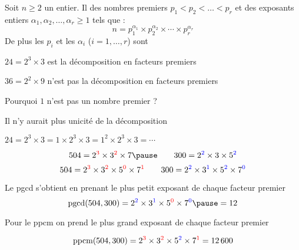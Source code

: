 \begin{frame}
  

\begin{theoreme}
Soit $n \ge 2$ un entier. Il  des nombres premiers $p_1 < p_2 < \ldots < p_r$
et des exposants entiers $\alpha_1, \alpha_2, \ldots, \alpha_r \ge 1$ tels que :
$$n = p_1^{\alpha_1} \times p_2^{\alpha_2} \times \cdots \times p_r^{\alpha_r}$$
\pause
De plus les $p_i$ et les $\alpha_i$ ($i=1,\ldots,r$) sont 
\end{theoreme}

\pause
\pause
\medskip

$24 = 2^3 \times 3$ est la décomposition en facteurs premiers

\pause
$36 = 2^2 \times 9$ n'est pas la décomposition en facteurs premiers

\pause
\bigskip

Pourquoi $1$ n'est pas un nombre premier ?

\pause
Il n'y aurait plus unicité de la décomposition 
\pause
\centerline{$24 = 2^3 \times 3 = 1 \times 2^3 \times 3 = 1^2 \times 2^3 \times 3 = \cdots$}
\end{frame}



\begin{frame}
\begin{exemple}
$$504 = 2^{\color{red}{3}} \times 3^{\color{red}{2}} \times 7 
\pause
\qquad 300 = 2^{\color{blue}{2}} \times 3 \times 5^{\color{blue}{2}}$$
\pause
$$504 = 2^{\color{red}{3}} \times 3^{\color{red}{2}} \times 5^{\color{red}{0}} \times 7^{\color{red}{1}} \qquad 
300 = 2^{\color{blue}{2}} \times 3^{\color{blue}{1}} \times 5^{\color{blue}{2}} \times 7^{\color{blue}{0}}$$

\pause
\medskip

Le pgcd s'obtient en prenant le plus petit exposant de chaque facteur premier
\pause
$$\pgcd(504,300) =  2^{\color{blue}{2}} \times 3^{\color{blue}{1}} \times 
5^{\color{red}{0}} \times 7^{\color{blue}{0}} \pause = 12$$

\pause
\medskip

Pour le ppcm on prend le plus grand exposant de chaque facteur premier

\pause
$$\text{ppcm}(504,300) =  2^{\color{red}{3}} \times 3^{\color{red}{2}} 
\times 5^{\color{blue}{2}} \times 7^{\color{red}{1}} = 12\,600$$
\end{exemple}

\end{frame}




